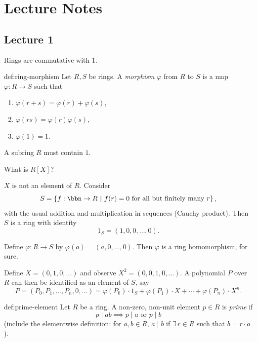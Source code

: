 \chapter{Lecture Notes}

\section{Lecture 1}

\begin{convention}
Rings are commutative with $1$.
\end{convention}

\begin{definition}{}{def:ring-morphism}
Let $R, S$ be rings. A \emph{morphism} $\varphi$ from $R$ to $S$ is a map $\varphi: R \to S$ such that
\begin{enumerate}[label=(\arabic*)]
    \item $\varphi(r + s) = \varphi(r) + \varphi(s)$,
    \item $\varphi(rs) = \varphi(r)\varphi(s)$,
    \item $\varphi(1) = 1$.
\end{enumerate}
\end{definition}

\begin{convention}
A subring $R$ must contain $1$.
\end{convention}

\begin{question}
What is $R[X]$?
\end{question}

$X$ is not an element of $R$. Consider
\[
S = \left\{ f : \bbn \to R \ \middle|\ f(r) = 0 \text{ for all but finitely many } r \right\},
\]
with the usual addition and multiplication in sequences (Cauchy product). Then $S$ is a ring with identity
\[
1_S = (1, 0, 0, \ldots, 0).
\]

Define $\varphi: R \to S$ by $\varphi(a) = (a, 0, \ldots, 0)$. Then $\varphi$ is a ring homomorphism, for sure.

Define $X = (0, 1, 0, \ldots)$ and observe $X^2 = (0, 0, 1, 0, \ldots)$. A polynomial $P$ over $R$ can then be identified as an element of $S$, say
\[
P = (P_0, P_1, \ldots, P_n, 0, \ldots) = \varphi(P_0) \cdot 1_S + \varphi(P_1) \cdot X + \cdots + \varphi(P_n) \cdot X^n.
\]

\begin{definition}{}{def:prime-element}
Let $R$ be a ring. A non-zero, non-unit element $p \in R$ is \emph{prime} if
\[
p \mid ab \implies p \mid a \text{ or } p \mid b
\]
(include the elementwise definition: for $a, b \in R$, $a \mid b$ if $\exists\, r \in R$ such that $b = r \cdot a$).
\end{definition}

